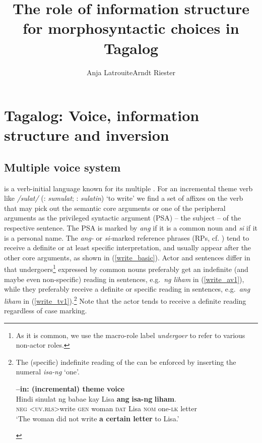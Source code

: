 \documentclass[output=paper,
,modfonts
,nonflat]{langsci/langscibook}
\title{The role of information structure for morphosyntactic choices in Tagalog}
\author{Anja Latrouite\affiliation{Heinrich-Heine-Universität Düsseldorf}\lastand  Arndt Riester\affiliation{Universität Stuttgart}}
\begin{document}
\maketitle

\section{Tagalog: Voice, information structure and inversion}\label{section_1}
\subsection{Multiple voice system}\label{section_voice}

 is a verb-initial language known for its multiple . For an incremental theme verb like \textit{/sulat/} (: \textit{sumulat}; : \textit{sulatin}) ‘to write’ we find a set of  affixes on the verb that may pick out the semantic core arguments or one of the peripheral arguments as the privileged syntactic argument (PSA) -- the subject -- of the respective sentence. The PSA is marked by \textit{ang} if it is a common noun and \textit{si} if it is a personal name. The \textit{ang-} or \textit{si-}marked reference phrases (RPs, cf. \citealt{valro08}) tend to receive a definite or at least specific interpretation, and usually appear after the other core arguments, as shown in (\ref{write_basic}). Actor and  sentences differ in that undergoers\footnote{As it is common, we use the macro-role label \textit{undergoer} to refer to various non-actor roles.} expressed by common nouns preferably get an indefinite (and maybe even non-specific) reading in  sentences, e.g.\ \textit{ng liham} in (\ref{write_av1}), while they preferably receive a definite or specific reading in  sentences, e.g.\ \textit{ang liham} in (\ref{write_tv1}).\footnote{The (specific) indefinite reading of the  can be enforced by inserting the numeral \textit{isa-ng} `one'.

\begin{exe}
\ex \textbf{–in: (incremental) theme voice}\\
\gll Hindi s{\USSmaller}in{\USGreater}ulat ng babae kay Lisa \textbf{ang} \textbf{isa-ng} \textbf{liham}.\\
 	\textsc{neg}  \textsc{<uv.rls>}write \textsc{gen} woman \textsc{dat} Lisa \textsc{nom} one-\textsc{lk} letter\\
\glt `The woman did not write \textbf{a certain letter} to Lisa.'
\end{exe}
} Note that the actor tends to receive a definite reading regardless of case marking.
\end{document}
